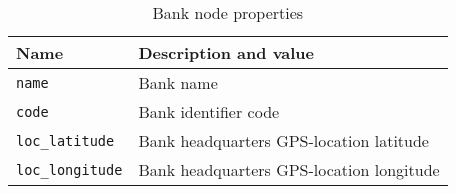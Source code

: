 \begin{table}[H]
    \centering
      \begin{tabular}{|l|l|}
      \hline
      \textbf{Name}        & \textbf{Description and value}                                      \\ \hline
      \texttt{name}         & Bank name                                                 \\ \hline
      \texttt{code}         & Bank identifier code                                      \\ \hline
      \texttt{loc\_latitude}  & Bank headquarters GPS-location latitude                   \\ \hline
      \texttt{loc\_longitude} & Bank headquarters GPS-location longitude                  \\ \hline
      \end{tabular}
    \caption{Bank node properties}
    \label{table:bank-node-properties}
\end{table}